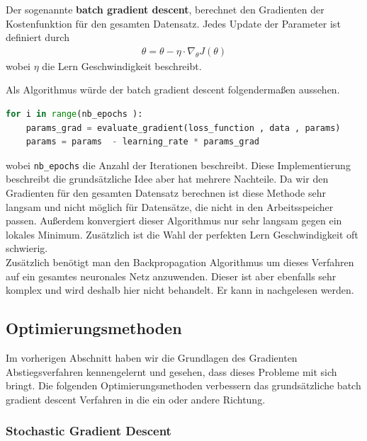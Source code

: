 \begin{definition}
    \cite[Kapitel 2.1]{Ruder.9152016}
    Der sogenannte \textbf{batch gradient descent}, berechnet den Gradienten der 
    Kostenfunktion für den gesamten Datensatz. Jedes Update der Parameter ist definiert durch
    \begin{align}
        \theta = \theta - \eta \cdot \nabla_\theta J(\theta)
    \end{align}
    wobei $\eta$ die Lern Geschwindigkeit beschreibt.
\end{definition}


Als Algorithmus würde der batch gradient descent folgendermaßen aussehen.

\begin{lstlisting}[language=Python]
for i in range(nb_epochs ):
    params_grad = evaluate_gradient(loss_function , data , params)
    params = params  - learning_rate * params_grad
\end{lstlisting}

wobei \texttt{nb\_epochs} die Anzahl der Iterationen beschreibt. 
Diese Implementierung beschreibt die grundsätzliche Idee aber hat mehrere 
Nachteile. Da wir den Gradienten für den gesamten Datensatz berechnen ist 
diese Methode sehr langsam und nicht möglich für Datensätze, die nicht in den 
Arbeitsspeicher passen. Außerdem konvergiert dieser Algorithmus nur sehr langsam gegen
ein lokales Minimum. Zusätzlich ist die Wahl der perfekten Lern Geschwindigkeit oft
schwierig. \\

Zusätzlich benötigt man den Backpropagation Algorithmus um dieses Verfahren auf
ein gesamtes neuronales Netz anzuwenden. Dieser ist aber ebenfalls sehr komplex
und wird deshalb hier nicht behandelt. Er kann in \cite[Kapitel 2]{MichaelNielsen.Juni2019}
nachgelesen werden.

\subsection{Optimierungsmethoden}\label{Optimierungsmethoden}

Im vorherigen Abschnitt haben wir die Grundlagen des Gradienten Abstiegsverfahren
kennengelernt und gesehen, dass dieses Probleme mit sich bringt. Die folgenden
Optimierungsmethoden verbessern das grundsätzliche batch gradient descent Verfahren
in die ein oder andere Richtung.


\subsubsection{Stochastic Gradient Descent}\label{Stochastic Gradient Descent}

